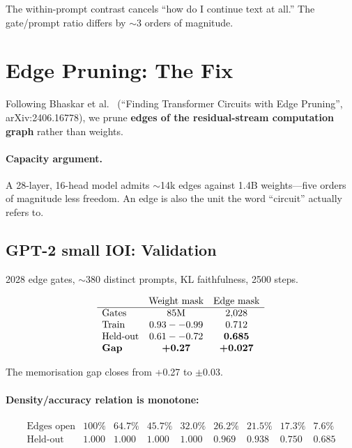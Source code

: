 \documentclass[11pt,a4paper]{article}
\begin{document}
The within-prompt contrast cancels ``how do I continue text at all.'' The
gate/prompt ratio differs by $\sim$3 orders of magnitude.

\section{Edge Pruning: The Fix}\label{sec:edges}

Following Bhaskar et al.~\cite{edgepruning} (``Finding Transformer Circuits with
Edge Pruning'', arXiv:2406.16778), we prune \textbf{edges of the residual-stream
computation graph} rather than weights.

\paragraph{Capacity argument.} A 28-layer, 16-head model admits $\sim$14k edges against
1.4B weights---five orders of magnitude less freedom. An edge is also the unit the word
``circuit'' actually refers to.

\subsection{GPT-2 small IOI: Validation}

2028 edge gates, $\sim$380 distinct prompts, KL faithfulness, 2500 steps.

\[
\begin{array}{lcc}
& \text{Weight mask} & \text{Edge mask} \\ \hline
\text{Gates} & 85\text{M} & 2{,}028 \\
\text{Train} & 0.93--0.99 & 0.712 \\
\text{Held-out} & 0.61--0.72 & \textbf{0.685} \\
\text{\textbf{Gap}} & \textbf{+0.27} & \textbf{+0.027} \\
\end{array}
\]

The memorisation gap closes from +0.27 to $\pm$0.03.

\paragraph{Density/accuracy relation is monotone:}
\[
\begin{array}{lccccccc}
\text{Edges open} & 100\% & 64.7\% & 45.7\% & 32.0\% & 26.2\% & 21.5\% & 17.3\% & 7.6\% \\ \hline
\text{Held-out} & 1.000 & 1.000 & 1.000 & 1.000 & 0.969 & 0.938 & 0.750 & 0.685 \\
\end{array}
\]
\end{document}
